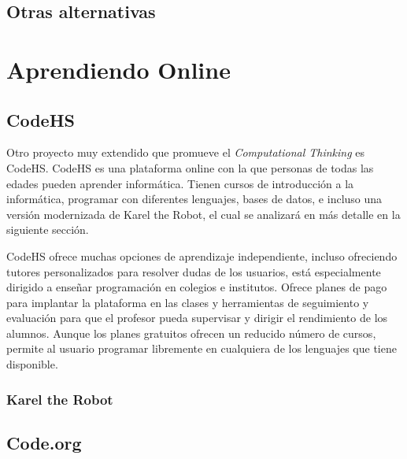 \subsection{{\color{green}Otras alternativas}}
\label{sec:robot-alternativas}


\section{Aprendiendo Online}
\label{sec:aprendiendo-online}

\subsection{CodeHS}
\label{sec:CodeHS}


Otro proyecto muy extendido que promueve el \emph{Computational Thinking} es CodeHS. CodeHS es una plataforma online con la que personas de todas las edades pueden aprender informática. Tienen cursos de introducción a la informática, programar con diferentes lenguajes, bases de datos, e incluso una versión modernizada de Karel the Robot, el cual se analizará en más detalle en la siguiente sección.

CodeHS ofrece muchas opciones de aprendizaje independiente, incluso ofreciendo tutores personalizados para resolver dudas de los usuarios, está especialmente dirigido a enseñar programación en colegios e institutos. Ofrece planes de pago para implantar la plataforma en las clases y herramientas de seguimiento y evaluación para que el profesor pueda supervisar y dirigir el rendimiento de los alumnos. Aunque los planes gratuitos ofrecen un reducido número de cursos, permite al usuario programar libremente en cualquiera de los lenguajes que tiene disponible. 


\subsubsection{Karel the Robot}
\label{sec:karel-the-robot}


\cite{pattis1981karel}




\subsection{Code.org}
\label{sec:Code.org}



